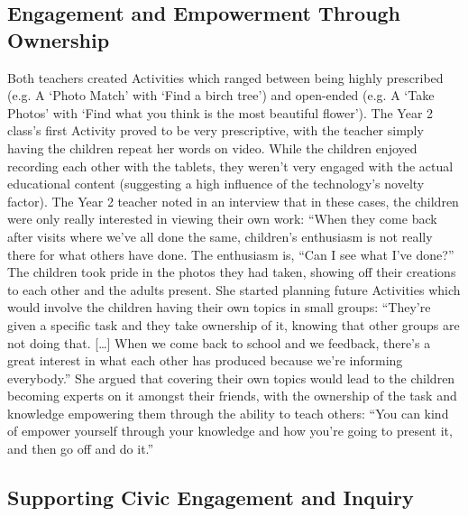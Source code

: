\subsection{Engagement and Empowerment Through Ownership}

Both teachers created Activities which ranged between being highly prescribed (e.g. A ‘Photo Match’ with ‘Find a birch tree’) and open-ended (e.g. A ‘Take Photos’ with ‘Find what you think is the most beautiful flower’). The Year 2 class’s first Activity proved to be very prescriptive, with the teacher simply having the children repeat her words on video. While the children enjoyed recording each other with the tablets, they weren’t very engaged with the actual educational content (suggesting a high influence of the technology’s novelty factor). The Year 2 teacher noted in an interview that in these cases, the children were only really interested in viewing their own work: “When they come back after visits where we’ve all done the same, children’s enthusiasm is not really there for what others have done. The enthusiasm is, “Can I see what I’ve done?” The children took pride in the photos they had taken, showing off their creations to each other and the adults present. She started planning future Activities which would involve the children having their own topics in small groups: “They’re given a specific task and they take ownership of it, knowing that other groups are not doing that. […] When we come back to school and we feedback, there’s a great interest in what each other has produced because we’re informing everybody.” She argued that covering their own topics would lead to the children becoming experts on it amongst their friends, with the ownership of the task and knowledge empowering them through the ability to teach others: “You can kind of empower yourself through your knowledge and how you’re going to present it, and then go off and do it.”

\subsection{Supporting Civic Engagement and Inquiry}

